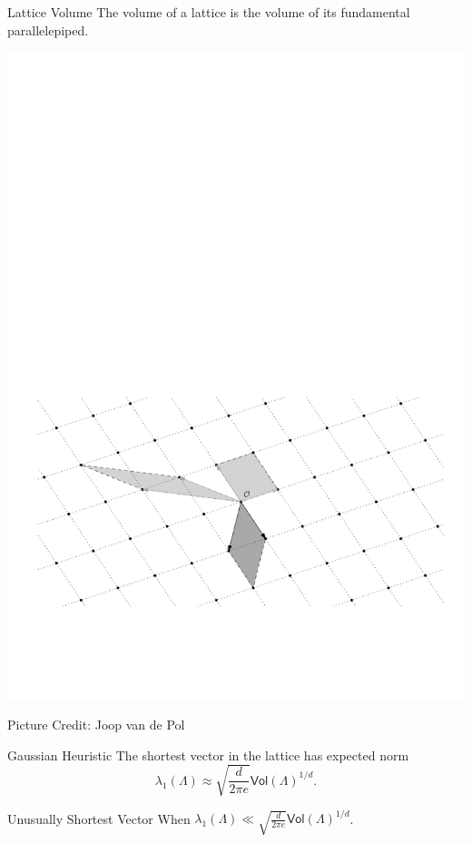 \documentclass[xcolor=table,10pt,aspectratio=169]{beamer}
\begin{document}
\begin{frame}[label={sec:org782d688}]{Lattice Volume}
The volume of a lattice is the volume of its fundamental parallelepiped.

\begin{center}
\includegraphics[width=0.8\linewidth]{./joop-vol3.pdf}
\end{center}

\tiny Picture Credit: Joop van de Pol
\end{frame}

\begin{frame}[label={sec:orga6a0826}]{Gaussian Heuristic}
The shortest vector in the lattice has expected norm \[λ_1(Λ) ≈ \sqrt{\frac{d}{2 π e}} \mathsf{Vol}(\Lambda)^{1/d}.\]

\begin{block}{Unusually Shortest Vector}
When \(λ_1(Λ) \ll \sqrt{\frac{d}{2 π e}} \mathsf{Vol}(\Lambda)^{1/d}\).
\end{block}
\end{frame}
\end{document}
